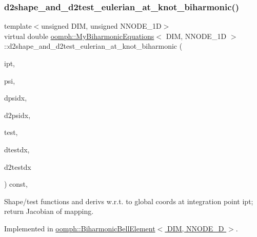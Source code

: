 \subsubsection{\texorpdfstring{d2shape\+\_\+and\+\_\+d2test\+\_\+eulerian\+\_\+at\+\_\+knot\+\_\+biharmonic()}{d2shape\_and\_d2test\_eulerian\_at\_knot\_biharmonic()}}
{\footnotesize\ttfamily template$<$unsigned D\+IM, unsigned N\+N\+O\+D\+E\+\_\+1D$>$ \\
virtual double \hyperlink{classoomph_1_1MyBiharmonicEquations}{oomph\+::\+My\+Biharmonic\+Equations}$<$ D\+IM, N\+N\+O\+D\+E\+\_\+1D $>$\+::d2shape\+\_\+and\+\_\+d2test\+\_\+eulerian\+\_\+at\+\_\+knot\+\_\+biharmonic (\begin{DoxyParamCaption}\item[{const unsigned \&}]{ipt,  }\item[{Shape \&}]{psi,  }\item[{D\+Shape \&}]{dpsidx,  }\item[{D\+Shape \&}]{d2psidx,  }\item[{Shape \&}]{test,  }\item[{D\+Shape \&}]{dtestdx,  }\item[{D\+Shape \&}]{d2testdx }\end{DoxyParamCaption}) const\hspace{0.3cm}{\ttfamily [protected]}, {}}



Shape/test functions and derivs w.\+r.\+t. to global coords at integration point ipt; return Jacobian of mapping. 



Implemented in \hyperlink{classoomph_1_1BiharmonicBellElement_a5a98ec12400b72d5fd31e62c6c250339}{oomph\+::\+Biharmonic\+Bell\+Element$<$ D\+I\+M, N\+N\+O\+D\+E\+\_\+D $>$}.

\mbox{\label{classoomph_1_1MyBiharmonicEquations_a4597b3938b6f1244d6e8e0f58250c14a}} 
